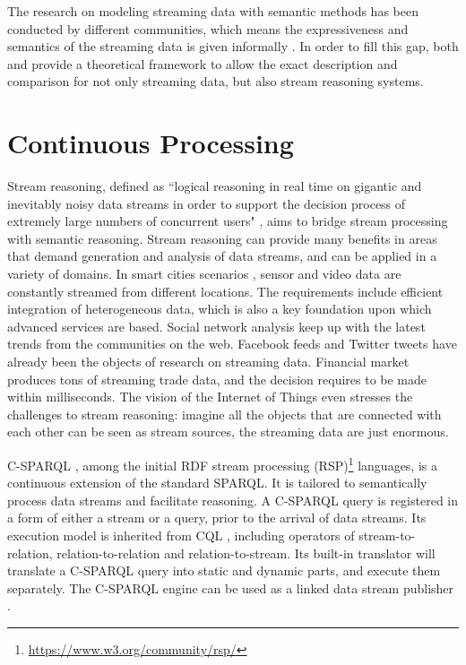 The research on modeling streaming data with semantic methods has been conducted by different communities, which means the expressiveness and semantics of the streaming data is given informally \cite{della2009s}.
In order to fill this gap, both \cite{beck2015towards} and \cite{beck2015lars} provide a theoretical framework to allow the exact description and comparison for not only streaming data, but also stream reasoning systems.
%
\section{Continuous Processing}
Stream reasoning, defined as ``logical reasoning in real time on gigantic and inevitably noisy data streams in order to support the decision process of extremely large numbers of concurrent users" \cite{stuckenschmidt2010towards}, aims to bridge stream processing with semantic reasoning. 
Stream reasoning can provide many benefits in areas that demand generation and analysis of data streams, and can be applied in a variety of domains.
In smart cities scenarios \cite{tallevi2013real} \cite{lecue2012capturing}, sensor and video data are constantly streamed from different locations.
The requirements include efficient integration of heterogeneous data, which is also a key foundation upon which advanced services are based. 
Social network analysis \cite{barbieri2009continuous} keep up with the latest trends from the communities on the web.
Facebook feeds and Twitter tweets have already been the objects of research on streaming data.
Financial market \cite{stonebraker20058} produces tons of streaming trade data, and the decision requires to be made within milliseconds.
The vision of the Internet of Things \cite{atzori2010internet} even stresses the challenges to stream reasoning: imagine all the objects that are connected with each other can be seen as stream sources, the streaming data are just enormous. 

C-SPARQL \cite{barbieri2009c}, among the initial RDF stream processing (RSP)\footnote{\url{https://www.w3.org/community/rsp/}} languages, is a continuous extension of the standard SPARQL. 
It is tailored to semantically process data streams and facilitate reasoning. 
A C-SPARQL query is registered in a form of either a stream or a query, prior to the arrival of data streams.
Its execution model is inherited from CQL \cite{arasu2006cql}, including operators of stream-to-relation, relation-to-relation and relation-to-stream. 
Its built-in translator will translate a C-SPARQL query into static and dynamic parts, and execute them separately. 
The C-SPARQL engine can be used as a linked data stream publisher \cite{barbieri2010proposal}. 

